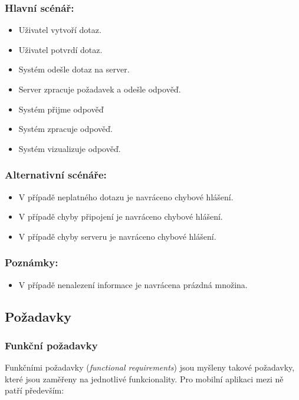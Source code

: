 \subsubsection*{Hlavní scénář:}
\begin{itemize}
 \item Uživatel vytvoří dotaz.
 \item Uživatel potvrdí dotaz.
 \item Systém odešle dotaz na server.
 \item Server zpracuje požadavek a odešle odpověď.
 \item Systém přijme odpověď
 \item Systém zpracuje odpověď.
 \item Systém vizualizuje odpověď.
\end{itemize}
\subsubsection*{Alternativní scénáře:}
\begin{itemize}
 \item V případě neplatného dotazu je navráceno chybové hlášení.
 \item V případě chyby připojení je navráceno chybové hlášení.
 \item V případě chyby serveru je navráceno chybové hlášení.
\end{itemize}
\subsubsection*{Poznámky:}
\begin{itemize}
 \item V případě nenalezení informace je navrácena prázdná množina.
\end{itemize}


\subsection{Požadavky}
\subsubsection{Funkční požadavky}
Funkčními požadavky (\textit{functional requirements}) jsou myšleny takové požadavky, které jsou zaměřeny na jednotlivé funkcionality. Pro mobilní aplikaci mezi ně patří především:

